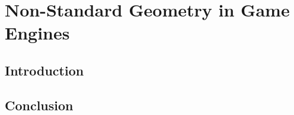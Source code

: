 \section{Non-Standard Geometry in Game Engines}
\label{lr:ne}

	\subsection{Introduction}
	\label{lr:ne:intro}
		
	\subsection{Conclusion}
	\label{lr:ne:conclusion}
